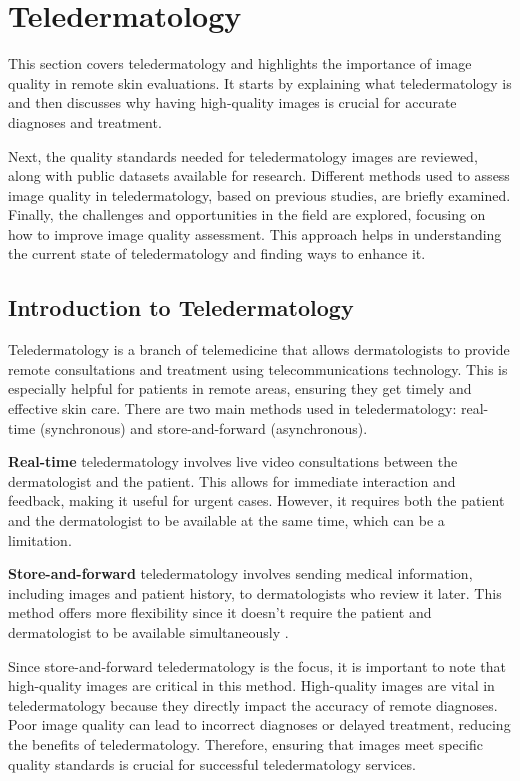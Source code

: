 \section{Teledermatology}
\label{sec:Teledermatology}
This section covers teledermatology and highlights the importance of image quality in remote skin evaluations. It starts by explaining what teledermatology is and then discusses why having high-quality images is crucial for accurate diagnoses and treatment. \par
\vspace{\baselineskip}
\noindent
Next, the quality standards needed for teledermatology images are reviewed, along with public datasets available for research. Different methods used to assess image quality in teledermatology, based on previous studies, are briefly examined. Finally, the challenges and opportunities in the field are explored, focusing on how to improve image quality assessment. This approach helps in understanding the current state of teledermatology and finding ways to enhance it. \par

\subsection{Introduction to Teledermatology}
\label{sub:IntroductionTeledermatology}
Teledermatology is a branch of telemedicine that allows dermatologists to provide remote consultations and treatment using telecommunications technology. This is especially helpful for patients in remote areas, ensuring they get timely and effective skin care. There are two main methods used in teledermatology: real-time (synchronous) and store-and-forward (asynchronous).\par
\vspace{\baselineskip}
\noindent
\textbf{Real-time} teledermatology involves live video consultations between the dermatologist and the patient. This allows for immediate interaction and feedback, making it useful for urgent cases. However, it requires both the patient and the dermatologist to be available at the same time, which can be a limitation. \par
\vspace{\baselineskip}
\noindent
\textbf{Store-and-forward} teledermatology involves sending medical information, including images and patient history, to dermatologists who review it later. This method offers more flexibility since it doesn’t require the patient and dermatologist to be available simultaneously \autocite{SaF}. \par
\vspace{\baselineskip}
\noindent
Since store-and-forward teledermatology is the focus, it is important to note that high-quality images are critical in this method. High-quality images are vital in teledermatology because they directly impact the accuracy of remote diagnoses. Poor image quality can lead to incorrect diagnoses or delayed treatment, reducing the benefits of teledermatology. Therefore, ensuring that images meet specific quality standards is crucial for successful teledermatology services.

